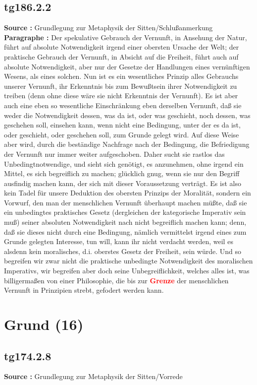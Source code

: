 \documentclass[a4paper,12pt,twoside]{book}
\newcommand{\match}[1]{\textcolor{red}{\textbf{#1}}}
\newcommand{\unnumberedsection}[1]{
	\section*{#1}
	\addcontentsline{toc}{section}{#1}
	\markright{#1}
}
\begin{document}
	\subsection*{tg186.2.2} 
	\textbf{Source : }Grundlegung zur Metaphysik der Sitten/Schlußanmerkung\\  
	
	\noindent\textbf{Paragraphe : }Der spekulative Gebrauch der Vernunft, in Ansehung der Natur, führt auf absolute Notwendigkeit irgend einer obersten Ursache der Welt; der praktische Gebrauch der Vernunft, in Absicht auf die Freiheit, führt auch auf absolute Notwendigkeit, aber nur der Gesetze der Handlungen eines vernünftigen Wesens, als eines solchen. Nun ist es ein wesentliches Prinzip alles Gebrauchs unserer Vernunft, ihr Erkenntnis bis zum Bewußtsein ihrer Notwendigkeit zu treiben (denn ohne diese wäre sie nicht Erkenntnis der Vernunft). Es ist aber auch eine eben so wesentliche Einschränkung eben derselben Vernunft, daß sie weder die Notwendigkeit dessen, was da ist, oder was geschieht, noch dessen, was geschehen soll, einsehen kann, wenn nicht eine Bedingung, unter der es da ist, oder geschieht, oder geschehen soll, zum Grunde gelegt wird. Auf diese Weise aber wird, durch die beständige Nachfrage nach der Bedingung, die Befriedigung der Vernunft nur immer weiter aufgeschoben. Daher sucht sie rastlos das Unbedingtnotwendige, und sieht sich genötigt, es anzunehmen, ohne irgend ein Mittel, es sich begreiflich zu machen; glücklich gnug, wenn sie nur den Begriff ausfindig machen kann, der sich mit dieser Voraussetzung verträgt. Es ist also kein Tadel für unsere Deduktion des obersten Prinzips der Moralität, sondern ein Vorwurf, den man der menschlichen Vernunft überhaupt machen müßte, daß sie ein unbedingtes praktisches Gesetz (dergleichen der kategorische Imperativ sein muß) seiner absoluten Notwendigkeit nach nicht begreiflich machen kann; denn, daß sie dieses nicht durch eine  Bedingung, nämlich vermittelst irgend eines zum Grunde gelegten Interesse, tun will, kann ihr nicht verdacht werden, weil es alsdenn kein moralisches, d.i. oberstes Gesetz der Freiheit, sein würde. Und so begreifen wir zwar nicht die praktische unbedingte Notwendigkeit des moralischen Imperativs, wir begreifen aber doch seine Unbegreiflichkeit, welches alles ist, was billigermaßen von einer Philosophie, die bis zur \match{Grenze} der menschlichen Vernunft in Prinzipien strebt, gefodert werden kann. 
	
	\unnumberedsection{Grund (16)} 
	\subsection*{tg174.2.8} 
	\textbf{Source : }Grundlegung zur Metaphysik der Sitten/Vorrede\\  
	
\end{document}

